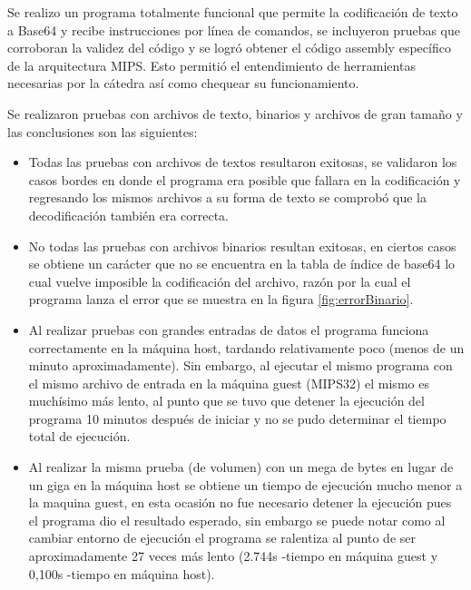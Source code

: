 \documentclass[titlepage,a4paper]{article}
\begin{document}
Se realizo un programa totalmente funcional que permite la codificación de texto a Base64 y recibe instrucciones por línea de comandos, se incluyeron pruebas que corroboran la validez del código y se logró obtener el código assembly específico de la arquitectura MIPS. Esto permitió el entendimiento de herramientas necesarias por la cátedra así como chequear su funcionamiento. \newline

Se realizaron pruebas con archivos de texto, binarios y archivos de gran tamaño y las conclusiones son las siguientes:
\begin{itemize}
    \item Todas las pruebas con archivos de textos resultaron exitosas, se validaron los casos bordes en donde el programa era posible que fallara en la codificación y regresando los mismos archivos a su forma de texto se comprobó que la decodificación también era correcta.
    
    \item No todas las pruebas con archivos binarios resultan exitosas, en ciertos casos se obtiene un carácter que no se encuentra en la tabla de índice de base64 lo cual vuelve imposible la codificación del archivo, razón por la cual el programa lanza el error que se muestra en la figura \ref{fig:errorBinario}.
    
    \item Al realizar pruebas con grandes entradas de datos el programa funciona correctamente en la máquina host, tardando relativamente poco (menos de un minuto aproximadamente). Sin embargo, al ejecutar el mismo programa con el mismo archivo de entrada en la máquina guest (MIPS32) el mismo es muchísimo más lento, al punto que se tuvo que detener la ejecución del programa 10 minutos después de iniciar y no se pudo determinar el tiempo total de ejecución.
    
    \item Al realizar la misma prueba (de volumen) con un mega de bytes en lugar de un giga en la máquina host se obtiene un tiempo de ejecución mucho menor a la maquina guest, en esta ocasión no fue necesario detener la ejecución pues el programa dio el resultado esperado, sin embargo se puede notar como al cambiar entorno de ejecución el programa se ralentiza al punto de ser aproximadamente 27 veces más lento (2.744s -tiempo en máquina guest y 0,100s -tiempo en máquina host).
    
\end{itemize}
\end{document}
